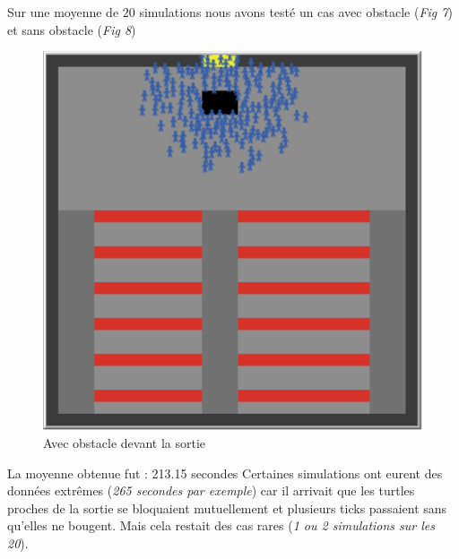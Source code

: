 \documentclass{article}
\begin{document}
Sur une moyenne de 20 simulations nous avons testé un cas avec obstacle ({\it Fig 7}) et sans obstacle ({\it Fig 8})
\begin{figure}[H]
	\includegraphics[scale=0.35]{obstacle.PNG}
  \centering
	\caption{Avec obstacle devant la sortie }
 	\label{pic: obstacle}
\end{figure}

La moyenne obtenue fut : 213.15 secondes
Certaines simulations ont eurent des données extrêmes ({\em 265 secondes par exemple}) car il arrivait que les turtles proches de la sortie se bloquaient mutuellement et plusieurs ticks passaient sans qu'elles ne bougent. Mais cela restait des cas rares ({\em 1 ou 2 simulations sur les 20}).
\end{document}
